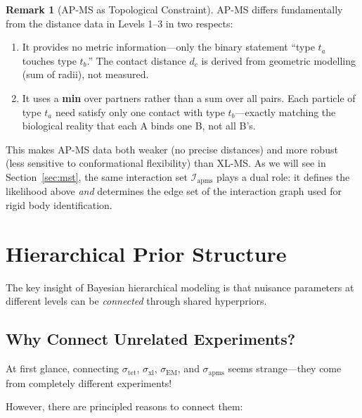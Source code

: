 \documentclass[11pt,a4paper]{article}
\theoremstyle{definition}
\newtheorem{remark}{Remark}
\begin{document}
\begin{remark}[AP-MS as Topological Constraint]
AP-MS differs fundamentally from the distance data in Levels 1--3 in two respects:
\begin{enumerate}
    \item It provides no metric information---only the binary statement ``type $t_a$ touches type $t_b$.'' The contact distance $d_c$ is derived from geometric modelling (sum of radii), not measured.
    \item It uses a \textbf{min} over partners rather than a sum over all pairs. Each particle of type $t_a$ need satisfy only one contact with type $t_b$---exactly matching the biological reality that each A binds one B, not all B's.
\end{enumerate}
This makes AP-MS data both weaker (no precise distances) and more robust (less sensitive to conformational flexibility) than XL-MS. As we will see in Section~\ref{sec:mst}, the same interaction set $\mathcal{I}_{\text{apms}}$ plays a dual role: it defines the likelihood above \textit{and} determines the edge set of the interaction graph used for rigid body identification.
\end{remark}

\section{Hierarchical Prior Structure}

The key insight of Bayesian hierarchical modeling is that nuisance parameters at different levels can be \textit{connected} through shared hyperpriors.

\subsection{Why Connect Unrelated Experiments?}

At first glance, connecting $\sigma_{\text{tet}}$, $\sigma_{\text{xl}}$, $\sigma_{\text{EM}}$, and $\sigma_{\text{apms}}$ seems strange---they come from completely different experiments!

However, there are principled reasons to connect them:
\end{document}
